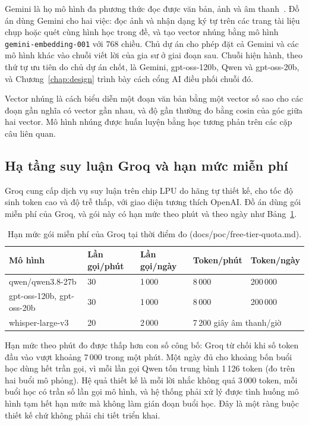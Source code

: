 Gemini là họ mô hình đa phương thức đọc được văn bản, ảnh và âm thanh~\cite{gemini2023}. Đồ án dùng Gemini cho hai việc: đọc ảnh và nhận dạng ký tự trên các trang tài liệu chụp hoặc quét cùng hình học trong đề, và tạo vector nhúng bằng mô hình \texttt{gemini-embedding-001} với 768 chiều. Chủ dự án cho phép đặt cả Gemini và các mô hình khác vào chuỗi viết lời của gia sư ở giai đoạn sau. Chuỗi hiện hành, theo thứ tự ưu tiên do chủ dự án chốt, là Gemini, gpt-oss-120b, Qwen và gpt-oss-20b, và Chương~\ref{chap:design} trình bày cách cổng AI điều phối chuỗi đó.

Vector nhúng là cách biểu diễn một đoạn văn bản bằng một vector số sao cho các đoạn gần nghĩa có vector gần nhau, và độ gần thường đo bằng cosin của góc giữa hai vector. Mô hình nhúng được huấn luyện bằng học tương phản trên các cặp câu liên quan.

\subsection{Hạ tầng suy luận Groq và hạn mức miễn phí}
Groq cung cấp dịch vụ suy luận trên chip LPU do hãng tự thiết kế, cho tốc độ sinh token cao và độ trễ thấp, với giao diện tương thích OpenAI. Đồ án dùng gói miễn phí của Groq, và gói này có hạn mức theo phút và theo ngày như Bảng~\ref{tab:quota}.

\begin{table}[ht]
\centering
\caption{Hạn mức gói miễn phí của Groq tại thời điểm đo (docs/poc/free-tier-quota.md).}
\label{tab:quota}
\small
\begin{tabularx}{\linewidth}{@{}lXXXX@{}}
\toprule
Mô hình & Lần gọi/phút & Lần gọi/ngày & Token/phút & Token/ngày \\
\midrule
qwen/qwen3.8-27b & 30 & 1\,000 & 8\,000 & 200\,000 \\
gpt-oss-120b, gpt-oss-20b & 30 & 1\,000 & 8\,000 & 200\,000 \\
whisper-large-v3 & 20 & 2\,000 & \multicolumn{2}{l}{7\,200 giây âm thanh/giờ} \\
\bottomrule
\end{tabularx}
\end{table}

Hạn mức theo phút đo được thấp hơn con số công bố: Groq từ chối khi số token đầu vào vượt khoảng 7\,000 trong một phút. Một ngày đủ cho khoảng bốn buổi học dùng hết trần gọi, vì mỗi lần gọi Qwen tốn trung bình 1\,126 token (đo trên hai buổi mô phỏng). Hệ quả thiết kế là mỗi lời nhắc không quá 3\,000 token, mỗi buổi học có trần số lần gọi mô hình, và hệ thống phải xử lý được tình huống mô hình tạm hết hạn mức mà không làm gián đoạn buổi học. Đây là một ràng buộc thiết kế chứ không phải chi tiết triển khai.
